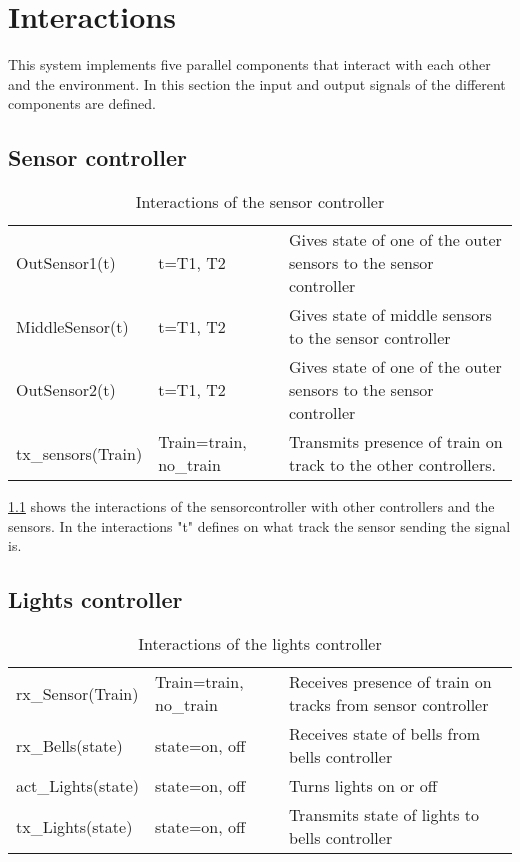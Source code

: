 \documentclass[final]{report}
\begin{document}
\chapter{Interactions}
This system implements five parallel components that interact with each other and the environment. In this section the input and output signals of the different components are defined.

\section{Sensor controller}
\begin{table}[h]
\centering
\begin{tabular}{|l|l|l|}
\hline
OutSensor1(t) & t=T1, T2 & Gives state of one of the outer sensors to the sensor controller  \\
MiddleSensor(t) & t=T1, T2           & Gives state of middle
 sensors to the sensor controller \\ 
OutSensor2(t) & t=T1, T2 & Gives state of one of the outer sensors to the sensor controller  \\\hline
tx\_sensors(Train) & Train=train, no\_train & Transmits presence of train on track to the other controllers.  \\\hline
\end{tabular}
\caption{Interactions of the sensor controller}
\label{sensorSignals}
\end{table}

\cref{sensorSignals} shows the interactions of the sensorcontroller with other controllers and the sensors. In the interactions "t" defines on what track the sensor sending the signal is.

\section{Lights controller}
\begin{table}[h]
\centering
\begin{tabular}{|l|l|l|}
\hline
rx\_Sensor(Train)  & Train=train, no\_train & Receives presence of train on tracks from sensor controller \\
rx\_Bells(state)   & state=on, off          & Receives state of bells from bells controller               \\ \hline
act\_Lights(state) & state=on, off          & Turns lights on or off                                      \\
tx\_Lights(state)  & state=on, off          & Transmits state of lights to bells controller               \\ \hline
\end{tabular}
\caption{Interactions of the lights controller}
\label{lightsSignals}
\end{table}
\end{document}
